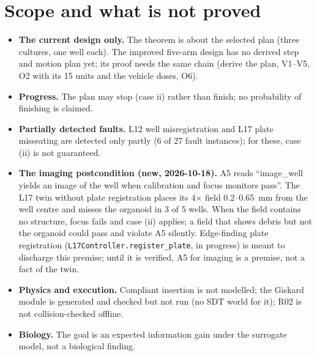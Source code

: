 \documentclass[10pt,a4paper]{article}
\theoremstyle{plain}\newtheorem{theorem}{Theorem}\newtheorem{lemma}{Lemma}\newtheorem{corollary}{Corollary}
\theoremstyle{definition}\newtheorem{definition}{Definition}\newtheorem{assumption}{Assumption}
\theoremstyle{remark}\newtheorem*{remark}{Remark}
\begin{document}
\section{Scope and what is not proved}
\begin{itemize}
\item \textbf{The current design only.} The theorem is about the selected plan (three cultures, one well each). The
improved five-arm design has no derived step and motion plan yet; its proof needs the same chain (derive the plan,
V1--V5, O2 with its 15 units and the vehicle doses, O6).
\item \textbf{Progress.} The plan may stop (case ii) rather than finish; no probability of finishing is claimed.
\item \textbf{Partially detected faults.} L12 well misregistration and L17 plate misseating are detected only partly
(6 of 27 fault instances); for these, case (ii) is not guaranteed.
\item \textbf{The imaging postcondition (new, 2026-10-18).} A5 reads ``image\_well yields an image of the well when
calibration and focus monitors pass''. The L17 twin without plate registration places its 4$\times$ field 0.2--0.65~mm
from the well centre and misses the organoid in 3 of 5 wells. When the field contains no structure, focus fails and case
(ii) applies; a field that shows debris but not the organoid could pass and violate A5 silently. Edge-finding plate
registration (\texttt{L17Controller.register\_plate}, in progress) is meant to discharge this premise; until it is
verified, A5 for imaging is a premise, not a fact of the twin.
\item \textbf{Physics and execution.} Compliant insertion is not modelled; the Giskard module is generated and checked
but not run (no SDT world for it); R02 is not collision-checked offline.
\item \textbf{Biology.} The goal is an expected information gain under the surrogate model, not a biological finding.
\end{itemize}
\end{document}

